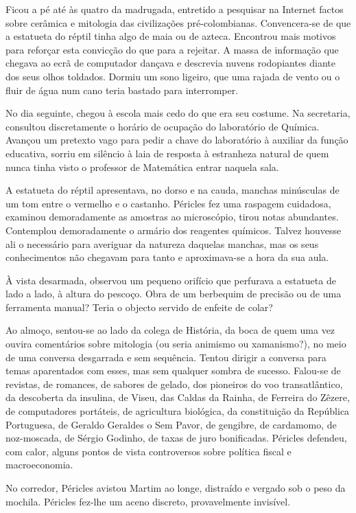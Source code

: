 Ficou a pé até às quatro da madrugada, entretido a pesquisar
na Internet factos sobre cerâmica e mitologia das civilizações
pré-colombianas. Convencera-se de que a estatueta do réptil tinha algo
de maia ou de azteca. Encontrou mais motivos para reforçar esta
convicção do que para a rejeitar. A massa de informação que chegava ao
ecrã de computador dançava e descrevia nuvens rodopiantes diante dos
seus olhos toldados. Dormiu um sono ligeiro, que uma rajada de vento ou
o fluir de água num cano teria bastado para interromper.

No dia seguinte, chegou à escola mais cedo do que era seu costume. Na
secretaria, consultou discretamente o horário de ocupação do laboratório
de Química. Avançou um pretexto vago para pedir a chave do laboratório à
auxiliar da função educativa, sorriu em silêncio à laia de resposta à
estranheza natural de quem nunca tinha visto o professor de Matemática
entrar naquela sala.

A estatueta do réptil apresentava, no dorso e na cauda, manchas
minúsculas de um tom entre o vermelho e o castanho. Péricles fez uma
raspagem cuidadosa, examinou demoradamente as amostras ao microscópio,
tirou notas abundantes. Contemplou demoradamente o armário dos
reagentes químicos. Talvez houvesse ali o necessário para averiguar da
natureza daquelas manchas, mas os seus conhecimentos não chegavam para
tanto e aproximava-se a hora da sua aula.

À vista desarmada, observou um pequeno orifício que perfurava a
estatueta de lado a lado, à altura do pescoço. Obra de um berbequim de
precisão ou de uma ferramenta manual? Teria o objecto servido de enfeite
de colar?

Ao almoço, sentou-se ao lado da colega de História, da boca de quem uma
vez ouvira comentários sobre mitologia (ou seria animismo ou
xamanismo?), no meio de uma conversa desgarrada e sem sequência.
Tentou dirigir a conversa para temas
aparentados com esses, mas sem qualquer sombra de sucesso. Falou-se de
revistas, de romances, de sabores de gelado, dos pioneiros do voo
transatlântico, da descoberta da insulina, de Viseu, das Caldas da
Rainha, de Ferreira do Zêzere, de computadores portáteis, de agricultura
biológica, da constituição da República Portuguesa, de Geraldo
Geraldes o Sem Pavor, de gengibre, de cardamomo, de noz-moscada, de
Sérgio Godinho, de taxas de juro bonificadas. Péricles defendeu, com
calor, alguns pontos de vista controversos sobre política fiscal e
macroeconomia.

No corredor, Péricles avistou Martim ao longe, distraído e vergado sob o
peso da mochila. Péricles fez-lhe um aceno discreto, provavelmente
invisível.


